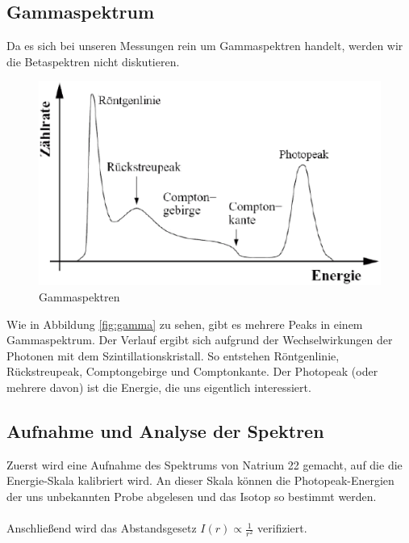 \documentclass{article}
\begin{document}
\subsection{Gammaspektrum}
Da es sich bei unseren Messungen rein um Gammaspektren handelt, werden wir die Betaspektren nicht diskutieren. 
\begin{center}
\begin{figure}
\includegraphics[scale=0.4]{gammaspektren.eps}
\caption{Gammaspektren}
\end{figure}
\label{fig:gamma}
\end{center}
Wie in Abbildung \ref{fig:gamma} zu sehen, gibt es mehrere Peaks in einem Gammaspektrum. Der Verlauf ergibt sich aufgrund der Wechselwirkungen der Photonen mit dem Szintillationskristall. So entstehen Röntgenlinie, Rückstreupeak, Comptongebirge und Comptonkante. Der Photopeak (oder mehrere davon) ist die Energie, die uns eigentlich interessiert. 

\subsection{Aufnahme und Analyse der Spektren}
Zuerst wird eine Aufnahme des Spektrums von Natrium 22 gemacht, auf die die Energie-Skala kalibriert wird. An dieser Skala können die Photopeak-Energien der uns unbekannten Probe abgelesen und das Isotop so bestimmt werden.\\
\\
Anschließend wird das Abstandsgesetz $I(r)\propto\frac{1}{r^2}$ verifiziert.
\end{document}
